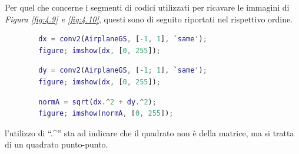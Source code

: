 \documentclass{subfiles}
\begin{document}
Per quel che concerne i segmenti di codici utilizzati per ricavare le immagini di \emph{Figura \ref{fig:4.9} \emph{e} \ref{fig:4.10}},
questi sono di seguito riportati nel rispettivo ordine.
\begin{center}
    \begin{lstlisting}[language = MATLAB]
        % caricamento di AirplaneGS.png
        dx = conv2(AirplaneGS, [-1, 1], `same');
        figure; imshow(dx, [0, 255]);
    \end{lstlisting}
    \begin{lstlisting}[language = MATLAB]
        % caricamento di AirplaneGS.png
        dy = conv2(AirplaneGS, [-1; 1], `same');
        figure; imshow(dx, [0, 255]);
    \end{lstlisting}
    \begin{lstlisting}[language = MATLAB]
        % dx e dy sono le immagine sin ora calcolate
        normA = sqrt(dx.^2 + dy.^2);
        figure; imshow(normA, [0, 255]);
    \end{lstlisting}
\end{center}

\begin{Note*}
    l'utilizzo di ``.\textasciicircum '' sta ad indicare che il quadrato non è della matrice, ma si tratta di un quadrato punto-punto.
\end{Note*}
\end{document}
